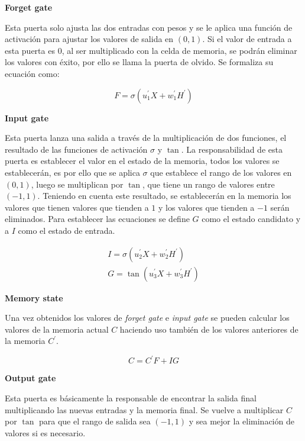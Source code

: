   \textbf{Forget gate}
  
  Esta puerta solo ajusta las dos entradas con pesos y se le aplica una funci\'{o}n de activaci\'{o}n para ajustar los valores de salida en $(0,1)$. Si el valor de entrada a esta puerta es $0$, al ser multiplicado con la celda de memoria, se podr\'{a}n eliminar los valores con \'{e}xito, por ello se llama la puerta de olvido. Se formaliza su ecuaci\'{o}n como:
  
  \begin{equation}
  	F=\sigma(u_{1}^{'}X+w_{1}^{'}H^{'})
  \end{equation}

\textbf{Input gate}

  Esta puerta lanza una salida a trav\'{e}s de la multiplicaci\'{o}n de dos funciones, el resultado de las funciones de activaci\'{o}n $\sigma$ y $\tan$. La responsabilidad de esta puerta es establecer el valor en el estado de la memoria, todos los valores se establecer\'{a}n, es por ello que se aplica $\sigma$ que establece el rango de los valores en $(0,1)$, luego se multiplican por $\tan$, que tiene un rango de valores entre $(-1,1)$. Teniendo en cuenta este resultado, se establecer\'{a}n en la memoria los valores que tienen valores que tienden a $1$ y los valores que tienden a $-1$ ser\'{a}n eliminados. Para establecer las ecuaciones se define $G$ como el estado candidato y a $I$ como el estado de entrada.
  
  \begin{align}
  	I=\sigma(u_{2}^{'}X+w_{2}^{'}H^{'})\\
  	G=\tan(u_{3}^{'}X+w_{3}^{'}H^{'})
  \end{align}

\textbf{Memory state}

  Una vez obtenidos los valores de \textit{forget gate} e \textit{input gate} se pueden calcular los valores de la memoria actual $C$ haciendo uso tambi\'{e}n de los valores anteriores de la memoria $C^{'}$.
  
  \begin{equation}
  	C=C^{'}F+IG
  \end{equation}

\textbf{Output gate}

  Esta puerta es b\'{a}sicamente la responsable de encontrar la salida final multiplicando las nuevas entradas y la memoria final. Se vuelve a multiplicar $C$ por $\tan$ para que el rango de salida sea $(-1,1)$ y sea mejor la eliminaci\'{o}n de valores si es necesario.
  
